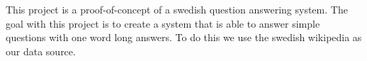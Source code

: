 
This project is a proof-of-concept of a swedish question answering system.
The goal with this project is to create a system that is able to answer simple questions with one word long answers.
To do this we use the swedish wikipedia as our data source.